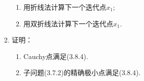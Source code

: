 \begin{enumerate}
    \begin{enumerate}[label=(\roman*)]
        \item 用折线法计算下一个迭代点$x_1$;
        \item 用双折线法计算下一个迭代点$x_1$.
    \end{enumerate}
    \omitted
    \item 证明：
    \begin{enumerate}[label=(\arabic*)]
        \item Cauchy点满足(3.8.4).
        \item 子问题(3.7.2)的精确极小点满足(3.8.4).
    \end{enumerate}
    \omitted
\end{enumerate}
\clearpage
